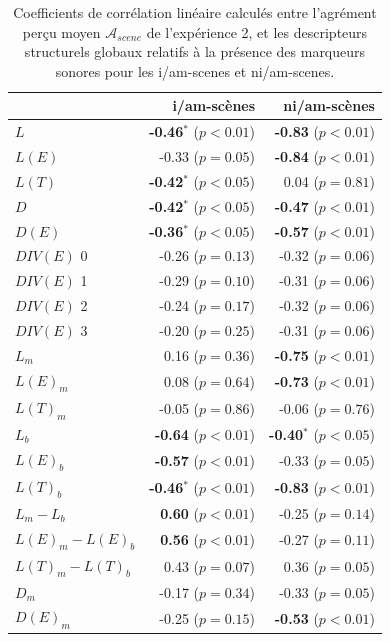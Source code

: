 \begin{table}[t]
\centering
\begin{tabular}{l r r} 
                   &   i/am-scènes                   & ni/am-scènes \\
\hline
$L$                & \textbf{-0.46$^{*}$} ($p<0.01$) & \textbf{-0.83} ($p<0.01$)\\
$L(E)$             & -0.33 ($p=0.05$)                & \textbf{-0.84} ($p<0.01$)\\
$L(T)$             & \textbf{-0.42$^{*}$} ($p<0.05$) &  0.04 ($p=0.81$) \\
$D$                & \textbf{-0.42$^{*}$} ($p<0.05$) & \textbf{-0.47} ($p<0.01$)\\
$D(E)$             & \textbf{-0.36$^{*}$} ($p<0.05$) & \textbf{-0.57} ($p<0.01$)\\
$DIV(E)$ 0         & -0.26 ($p=0.13$)                & -0.32 ($p=0.06$)\\
$DIV(E)$ 1         & -0.29 ($p=0.10$)                & -0.31 ($p=0.06$)\\
$DIV(E)$ 2         & -0.24 ($p=0.17$)                & -0.32 ($p=0.06$)\\
$DIV(E)$ 3         & -0.20 ($p=0.25$)                & -0.31 ($p=0.06$)\\
$L_m$              & 0.16  ($p=0.36$)                & \textbf{-0.75} ($p<0.01$) \\
$L(E)_m$           & 0.08  ($p=0.64$)                & \textbf{-0.73} ($p<0.01$) \\
$L(T)_m$           & -0.05 ($p=0.86$)                & -0.06 ($p=0.76$) \\
$L_b$              & \textbf{-0.64} ($p<0.01$)       & \textbf{-0.40$^{*}$} ($p<0.05$) \\
$L(E)_b$           & \textbf{-0.57} ($p<0.01$)       & -0.33 ($p=0.05$) \\
$L(T)_b$           & \textbf{-0.46$^{*}$} ($p<0.01$) & \textbf{-0.83} ($p<0.01$) \\
$L_m-L_b$          & \textbf{0.60} ($p<0.01$)        & -0.25 ($p=0.14$) \\
$L(E)_m-L(E)_b$    & \textbf{0.56} ($p<0.01$)        & -0.27 ($p=0.11$) \\
$L(T)_m-L(T)_b$    & 0.43 ($p=0.07$)                 & 0.36 ($p=0.05$) \\
$D_m$              & -0.17 ($p=0.34$)                & -0.33 ($p=0.05$) \\
$D(E)_m$           & -0.25 ($p=0.15$)                & \textbf{-0.53} ($p<0.01$) \\
\hline
\end{tabular}
\vspace{0.5mm}
\caption{Coefficients de corrélation linéaire calculés entre l'agrément perçu moyen $\mathcal{A}_{scene}$ de l'expérience 2, et les descripteurs structurels globaux relatifs à la présence des marqueurs sonores pour les i/am-scenes et ni/am-scenes.}
\label{tab:corrAmXP4}
\end{table}

